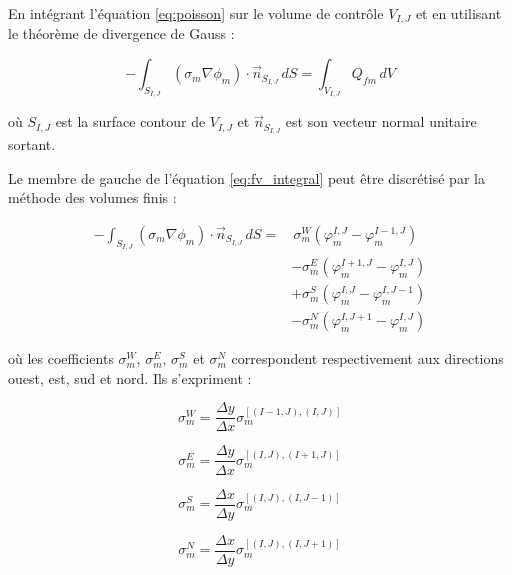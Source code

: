 En intégrant l'équation \eqref{eq:poisson} sur le volume de contrôle $V_{I,J}$ et en utilisant le théorème de divergence de Gauss :

\begin{equation}
-\int_{S_{I,J}} (\sigma_m \nabla \phi_m) \cdot \vec{n}_{S_{I,J}} \, dS = \int_{V_{I,J}} Q_{fm} \, dV
\label{eq:fv_integral}
\end{equation}

où $S_{I,J}$ est la surface contour de $V_{I,J}$ et $\vec{n}_{S_{I,J}}$ est son vecteur normal unitaire sortant.

Le membre de gauche de l'équation \eqref{eq:fv_integral} peut être discrétisé par la méthode des volumes finis :

\begin{equation}
\begin{split}
-\int_{S_{I,J}} (\sigma_m \nabla \phi_m) \cdot \vec{n}_{S_{I,J}} \, dS = &\, \sigma_m^W (\varphi_m^{I,J} - \varphi_m^{I-1,J}) \\
&- \sigma_m^E (\varphi_m^{I+1,J} - \varphi_m^{I,J}) \\
&+ \sigma_m^S (\varphi_m^{I,J} - \varphi_m^{I,J-1}) \\
&- \sigma_m^N (\varphi_m^{I,J+1} - \varphi_m^{I,J})
\end{split}
\label{eq:fv_discretized}
\end{equation}

où les coefficients $\sigma_m^W$, $\sigma_m^E$, $\sigma_m^S$ et $\sigma_m^N$ correspondent respectivement aux directions ouest, est, sud et nord. Ils s'expriment :

\begin{equation}
\sigma_m^W = \frac{\Delta y}{\Delta x} \sigma_m^{[(I-1,J),(I,J)]}
\label{eq:sigmaW}
\end{equation}

\begin{equation}
\sigma_m^E = \frac{\Delta y}{\Delta x} \sigma_m^{[(I,J),(I+1,J)]}
\label{eq:sigmaE}
\end{equation}

\begin{equation}
\sigma_m^S = \frac{\Delta x}{\Delta y} \sigma_m^{[(I,J),(I,J-1)]}
\label{eq:sigmaS}
\end{equation}

\begin{equation}
\sigma_m^N = \frac{\Delta x}{\Delta y} \sigma_m^{[(I,J),(I,J+1)]}
\label{eq:sigmaN}
\end{equation}

